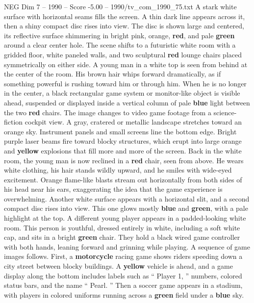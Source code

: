 \begin{textsample}{NEG Dim 7 – 1990 – Score -5.00 – 1990/tv\_com\_1990\_75.txt}  \label{ex:f7_neg_033}
A stark white surface with horizontal seams fills the screen.
A thin dark line appears across it, then a shiny compact disc rises into view.
The disc is shown large and centered, its reflective surface shimmering in bright pink, orange, \textbf{red}, and pale \textbf{green} around a clear center hole.
The scene shifts to a futuristic white room with a gridded floor, white paneled walls, and two sculptural \textbf{red} lounge chairs placed symmetrically on either side.
A young man in a white top is seen from behind at the center of the room.
His brown hair whips forward dramatically, as if something powerful is rushing toward him or through him.
When he is no longer in the center, a black rectangular game system or monitor-like object is visible ahead, suspended or displayed inside a vertical column of pale \textbf{blue} light between the two \textbf{red} chairs.
The image changes to video game footage from a science-fiction cockpit view.
A gray, cratered or metallic landscape stretches toward an orange sky.
Instrument panels and small screens line the bottom edge.
Bright purple laser beams fire toward blocky structures, which erupt into large orange and \textbf{yellow} explosions that fill more and more of the screen.
Back in the white room, the young man is now reclined in a \textbf{red} chair, seen from above.
He wears white clothing, his hair stands wildly upward, and he smiles with wide-eyed excitement.
Orange flame-like blasts stream out horizontally from both sides of his head near his ears, exaggerating the idea that the game experience is overwhelming.
Another white surface appears with a horizontal slit, and a second compact disc rises into view.
This one glows mostly \textbf{blue} and \textbf{green}, with a pale highlight at the top.
A different young player appears in a padded-looking white room.
This person is youthful, dressed entirely in white, including a soft white cap, and sits in a bright \textbf{green} chair.
They hold a black wired game controller with both hands, leaning forward and grinning while playing.
A sequence of game images follows.
First, a \textbf{motorcycle} racing game shows riders speeding down a city street between blocky buildings.
A \textbf{yellow} vehicle is ahead, and a game display along the bottom includes labels such as “ Player 1, ” numbers, colored status bars, and the name “ Pearl. ” Then a soccer game appears in a stadium, with players in colored uniforms running across a \textbf{green} field under a \textbf{blue} sky.

\end{textsample}
